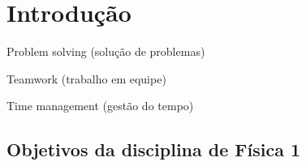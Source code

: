 \chapter{Introdução}




Problem solving (solução de problemas)

Teamwork (trabalho em equipe)

Time management (gestão do tempo)

\section{Objetivos da disciplina de Física 1}

